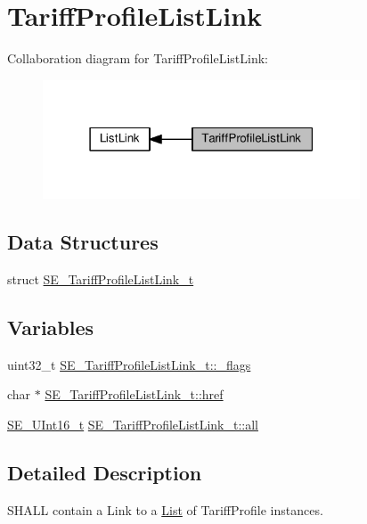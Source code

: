 \hypertarget{group__TariffProfileListLink}{}\section{Tariff\+Profile\+List\+Link}
\label{group__TariffProfileListLink}
Collaboration diagram for Tariff\+Profile\+List\+Link\+:\nopagebreak
\begin{figure}[H]
\begin{center}
\leavevmode
\includegraphics[width=267pt]{group__TariffProfileListLink}
\end{center}
\end{figure}
\subsection*{Data Structures}
\begin{DoxyCompactItemize}
\item 
struct \hyperlink{structSE__TariffProfileListLink__t}{S\+E\+\_\+\+Tariff\+Profile\+List\+Link\+\_\+t}
\end{DoxyCompactItemize}
\subsection*{Variables}
\begin{DoxyCompactItemize}
\item 
uint32\+\_\+t \hyperlink{group__TariffProfileListLink_ga0dc6e32b1d1482a70c30f1f8d19952a0}{S\+E\+\_\+\+Tariff\+Profile\+List\+Link\+\_\+t\+::\+\_\+flags}
\item 
char $\ast$ \hyperlink{group__TariffProfileListLink_gaf7827e008cf5e071627cedf3e60ac752}{S\+E\+\_\+\+Tariff\+Profile\+List\+Link\+\_\+t\+::href}
\item 
\hyperlink{group__UInt16_gac68d541f189538bfd30cfaa712d20d29}{S\+E\+\_\+\+U\+Int16\+\_\+t} \hyperlink{group__TariffProfileListLink_ga7a7b6ee13dc95e02bb1511987c9bcbc6}{S\+E\+\_\+\+Tariff\+Profile\+List\+Link\+\_\+t\+::all}
\end{DoxyCompactItemize}


\subsection{Detailed Description}
S\+H\+A\+LL contain a Link to a \hyperlink{structList}{List} of Tariff\+Profile instances. 

